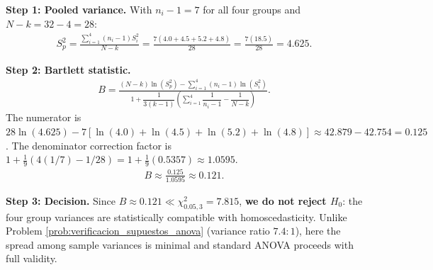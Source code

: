 \begin{solproblema}
	\textbf{Step 1: Pooled variance.}
	With $n_i - 1 = 7$ for all four groups and $N - k = 32 - 4 = 28$:
	\begin{align}
		S_p^2 = \frac{\sum_{i=1}^4 (n_i-1)S_i^2}{N-k} = \frac{7(4.0+4.5+5.2+4.8)}{28} = \frac{7(18.5)}{28} = 4.625.
	\end{align}

	\textbf{Step 2: Bartlett statistic.}
	\begin{align}
		B = \frac{(N-k)\ln(S_p^2) - \sum_{i=1}^4 (n_i-1)\ln(S_i^2)}{1 + \dfrac{1}{3(k-1)}\left(\sum_{i=1}^4 \dfrac{1}{n_i-1} - \dfrac{1}{N-k}\right)}.
	\end{align}
	The numerator is $28\ln(4.625) - 7[\ln(4.0)+\ln(4.5)+\ln(5.2)+\ln(4.8)] \approx 42.879 - 42.754 = 0.125$.
	The denominator correction factor is $1 + \frac{1}{9}\left(4(1/7) - 1/28\right) = 1 + \frac{1}{9}(0.5357) \approx 1.0595$.
	\begin{align}
		B \approx \frac{0.125}{1.0595} \approx 0.121.
	\end{align}

	\textbf{Step 3: Decision.}
	Since $B \approx 0.121 \ll \chi^2_{0.05,3} = 7.815$, \textbf{we do not reject $H_0$}: the four group variances are statistically compatible with homoscedasticity. Unlike Problem \ref{prob:verificacion_supuestos_anova} (variance ratio $7.4:1$), here the spread among sample variances is minimal and standard ANOVA proceeds with full validity.
\end{solproblema}

